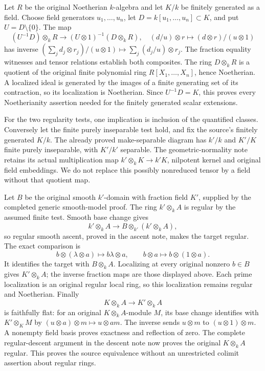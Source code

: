 Let \(R\) be the original Noetherian \(k\)-algebra and let \(K/k\) be finitely generated as a field. Choose field generators \(u_1,\ldots,u_n\), let \(D=k[u_1,\ldots,u_n]\subset K\), and put \(U=D\setminus\{0\}\). The map \[
 (U^{-1}D)\otimes_kR\longrightarrow(U\otimes1)^{-1}(D\otimes_kR),
 \quad(d/u)\otimes r\longmapsto(d\otimes r)/(u\otimes1)
\] has inverse \((\sum_jd_j\otimes r_j)/(u\otimes1)\mapsto\sum_j(d_j/u)\otimes r_j\). The fraction equality witnesses and tensor relations establish both composites. The ring \(D\otimes_kR\) is a quotient of the original finite polynomial ring \(R[X_1,\ldots,X_n]\), hence Noetherian. A localized ideal is generated by the images of a finite generating set of its contraction, so its localization is Noetherian. Since \(U^{-1}D=K\), this proves every Noetherianity assertion needed for the finitely generated scalar extensions.

For the two regularity tests, one implication is inclusion of the quantified classes. Conversely let the finite purely inseparable test hold, and fix the source's finitely generated \(K/k\). The already proved make-separable diagram has \(k'/k\) and \(K'/K\) finite purely inseparable, with \(K'/k'\) separable. The geometric-normality note retains its actual multiplication map \(k'\otimes_kK\to k'K\), nilpotent kernel and original field embeddings. We do not replace this possibly nonreduced tensor by a field without that quotient map.

Let \(B\) be the original smooth \(k'\)-domain with fraction field \(K'\), supplied by the completed generic smooth-model proof. The ring \(k'\otimes_kA\) is regular by the assumed finite test. Smooth base change gives \[
 k'\otimes_kA\longrightarrow B\otimes_{k'}(k'\otimes_kA),
\] so regular smooth ascent, proved in the ascent note, makes the target regular. The exact comparison is \[
 b\otimes(\lambda\otimes a)\longmapsto b\lambda\otimes a,
 \qquad b\otimes a\longmapsto b\otimes(1\otimes a).
\] It identifies the target with \(B\otimes_kA\). Localizing at every original nonzero \(b\in B\) gives \(K'\otimes_kA\); the inverse fraction maps are those displayed above. Each prime localization is an original regular local ring, so this localization remains regular and Noetherian. Finally \[
 K\otimes_kA\longrightarrow K'\otimes_kA
\] is faithfully flat: for an original \(K\otimes_kA\)-module \(M\), its base change identifies with \(K'\otimes_KM\) by \((u\otimes a)\otimes m\mapsto u\otimes am\). The inverse sends \(u\otimes m\) to \((u\otimes1)\otimes m\). A nonempty field basis proves exactness and reflection of zero. The complete regular-descent argument in the descent note now proves the original \(K\otimes_kA\) regular. This proves the source equivalence without an unrestricted colimit assertion about regular rings.

